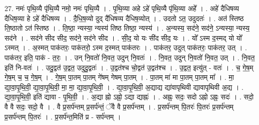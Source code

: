 \documentclass[17pt]{extarticle}
\begin{document}
27. नमः॑ पृथि॒व्यै पृ॑थि॒व्यै नमो॒ नमः॑ पृथि॒व्यै । . पृ॒थि॒व्या अहे ऽहे॑ पृथि॒व्यै पृ॑थि॒व्या अहे᳚ । . अहे॑ दैधिषव्य दैधिष॒व्या हे ऽहे॑ दैधिषव्य । . दै॒धि॒ष॒व्यो दुद् दै॑धिषव्य दैधिष॒व्योत् । . उदतो ऽत॒ उदुदतः॑ । . अत॑ स्तिष्ठ ति॒ष्ठातो ऽत॑ स्तिष्ठ । . ति॒ष्ठा॒ न्यस्या॒ न्यस्य॑ तिष्ठ तिष्ठा॒ न्यस्य॑ । . अ॒न्यस्य॒ सद॑ने॒ सद॑ने॒ ऽन्यस्या॒ न्यस्य॒ सद॑ने । . सद॑ने सीद सीद॒ सद॑ने॒ सद॑ने सीद । . सी॒द॒ यो यः सी॑द सीद॒ यः । . यो᳚ ऽस्म द॒स्मद् यो यो᳚ ऽस्मत् । . अ॒स्मत् पाक॑तरः॒ पाक॑तरो॒ ऽस्म द॒स्मत् पाक॑तरः । . पाक॑तर॒ उदुत् पाक॑तरः॒ पाक॑तर॒ उत् । . पाक॑तर॒ इति॒ पाक॑ - त॒रः॒ । . उन् नि॒वतो॑ नि॒वत॒ उदुन् नि॒वतः॑ । . नि॒वत॒ उदुन् नि॒वतो॑ नि॒वत॒ उत् । . नि॒वत॒ इति॑ नि-वतः॑ । . उदु॒द्वत॑ उ॒द्वत॒ उदुदु॒द्वतः॑ । . उ॒द्वत॑श्च चो॒द्वत॑ उ॒द्वत॑श्च । . उ॒द्वत॒ इत्यु॑त् - वतः॑ । . च॒ गे॒ष॒म् गे॒ष॒म् च॒ च॒ गे॒ष॒म् । . गे॒ष॒म् पा॒तम् पा॒तम् गे॑षम् गेषम् पा॒तम् । . पा॒तम् मा॑ मा पा॒तम् पा॒तम् मा᳚ । . मा॒ द्या॒वा॒पृ॒थि॒वी॒ द्या॒वा॒पृ॒थि॒वी॒ मा॒ मा॒ द्या॒वा॒पृ॒थि॒वी॒ । . द्या॒वा॒पृ॒थि॒वी॒ अ॒द्याद्य द्या॑वापृथिवी द्यावापृथिवी अ॒द्य । . द्या॒वा॒पृ॒थि॒वी॒ इति॑ द्यावा - पृ॒थि॒वी॒ । . अ॒द्या ह्नो ऽह्नो॒ ऽद्या द्याह्नः॑ । . अह्नः॒ सदः॒ सदो ऽह्नो ऽह्नः॒ सदः॑ । . सदो॒ वै वै सदः॒ सदो॒ वै । . वै प्र॒सर्प॑न्तम् प्र॒सर्प॑न्तं॒ ॅवै वै प्र॒सर्प॑न्तम् । . प्र॒सर्प॑न्तम् पि॒तरः॑ पि॒तरः॑ प्र॒सर्प॑न्तम् प्र॒सर्प॑न्तम् पि॒तरः॑ । . प्र॒सर्प॑न्त॒मिति॑ प्र - सर्प॑न्तम् । \newline
\end{document}
